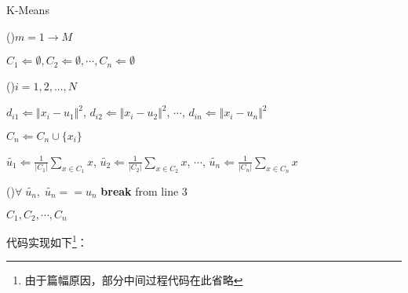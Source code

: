  \begin{algorithm}
        \caption{K-Means}
        \LinesNumbered
        
        \For(){$m = 1 \to M$} 
        {
        $C_1 \Leftarrow \emptyset, C_2 \Leftarrow \emptyset,\cdots,  C_n \Leftarrow \emptyset$
        
            \For(){$i = 1,2,...,N$ }     
            {
              $d_{i1} \Leftarrow {\Vert x_i-u_1 \Vert}^2$, $d_{i2} \Leftarrow {\Vert x_i-u_2 \Vert}^2$, $\cdots$, $d_{in} \Leftarrow {\Vert x_i-u_n \Vert}^2$ 
              
            { $C_n \Leftarrow C_n \cup \{x_i\}$ 
            }
            }
            
             $\tilde{u_1} \Leftarrow \frac{1}{\vert C_1 \vert}\sum\limits_{x \in C_1} x$, $\tilde{u_2} \Leftarrow \frac{1}{\vert C_2 \vert}\sum\limits_{x \in C_2} x$,
             $\cdots$,
             $\tilde{u_n} \Leftarrow \frac{1}{\vert C_n \vert}\sum\limits_{x \in C_n} x$
            
            \If(){$\forall\;\tilde{u_n},\;\tilde{u_n} == u_n$}
            {\textbf{break} from line 3 %
            }

           \Return $C_1, C_2, \cdots, C_n$ 
        }
                
    \end{algorithm}
    
代码实现如下\footnote{由于篇幅原因，部分中间过程代码在此省略}：
\vspace{0.3cm}

